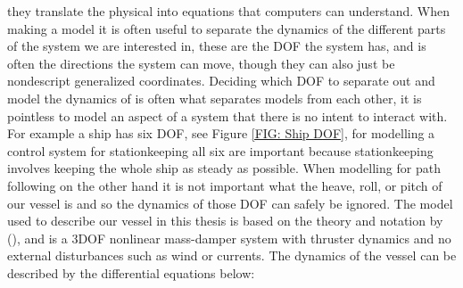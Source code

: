 they translate the physical into equations that computers can understand. When making a model it is often useful to separate the dynamics of the different parts of the 
system we are interested in, these are the \gls{DOF} the system has, and is often the directions the system can move, though they can also just be
nondescript generalized coordinates. Deciding which \gls{DOF} to separate out and model the dynamics of is often what separates models from each other, it is pointless to model
an aspect of a system that there is no intent to interact with. For example a ship has six \gls{DOF}, see Figure \ref{FIG: Ship DOF}, for modelling a control system for stationkeeping
all six are important because stationkeeping involves keeping the whole ship as steady as possible. When modelling for path following on the other hand it is not
important what the heave, roll, or pitch of our vessel is and so the dynamics of those \gls{DOF} can safely be ignored. 
The model used to describe our vessel in this thesis is based on the theory and notation by (\cite{fossen2011handbook}), and is a 3\gls{DOF} nonlinear mass-damper system with
thruster dynamics and no external disturbances such as wind or currents. The dynamics of the vessel can be described by the differential equations below:

